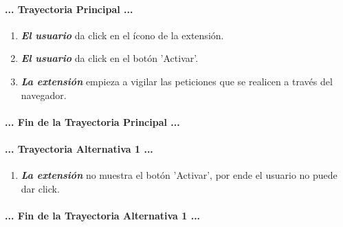 \documentclass[12pt, a4paper, titlepage]{report}
\begin{document}
				\paragraph{... Trayectoria Principal ...}
				\begin{enumerate}
					
					\item \textbf{\textit{El usuario}} da click en el ícono de la extensión.
					
					\item \textbf{\textit{El usuario}} da click en el botón 'Activar'.
					
					\item \textbf{\textit{La extensión}} empieza a vigilar las peticiones que se realicen a través del navegador.
					
				\end{enumerate}
				\paragraph{... Fin de la Trayectoria Principal ...}
				
				\paragraph{... Trayectoria Alternativa 1 ...}
				\begin{enumerate}
				
				    \item \textbf{\textit{La extensión}} no muestra el botón 'Activar', por ende el usuario no puede dar click.
				
				\end{enumerate}
				\paragraph{... Fin de la Trayectoria Alternativa 1 ...}
				\newpage
				
\end{document}
